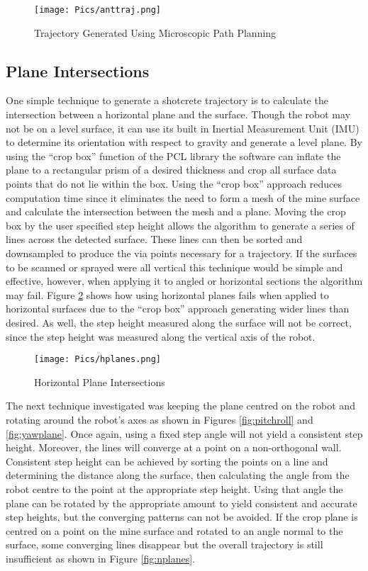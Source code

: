 \begin{figure}[h]
    \centering
    \texttt{[image: Pics/anttraj.png]}
    \caption{Trajectory Generated Using Microscopic Path Planning}
    \label{fig:anttraj}
\end{figure}

\subsection{Plane Intersections}

One simple technique to generate a shotcrete trajectory is to calculate the intersection between a horizontal plane and the surface. Though the robot may not be on a level surface, it can use its built in Inertial Measurement Unit (IMU) to determine its orientation with respect to gravity and generate a level plane. By using the ``crop box'' function of the PCL library the software can inflate the plane to a rectangular prism of a desired thickness and crop all surface data points that do not lie within the box. Using the ``crop box'' approach reduces computation time since it eliminates the need to form a mesh of the mine surface and calculate the intersection between the mesh and a plane. Moving the crop box by the user specified step height allows the algorithm to generate a series of lines across the detected surface. These lines can then be sorted and downsampled to produce the via points necessary for a trajectory. If the surfaces to be scanned or sprayed were all vertical this technique would be simple and effective, however, when applying it to angled or horizontal sections the algorithm may fail. Figure \ref{fig:hplanes} shows how using horizontal planes fails when applied to horizontal surfaces due to the ``crop box'' approach generating wider lines than desired. As well, the step height measured along the surface will not be correct, since the step height was measured along the vertical axis of the robot.\\

\begin{figure}[h]
    \centering
    \texttt{[image: Pics/hplanes.png]}
    \caption{Horizontal Plane Intersections}
    \label{fig:hplanes}
\end{figure}
The next technique investigated was keeping the plane centred on the robot and rotating around the robot's axes as shown in Figures \ref{fig:pitchroll} and \ref{fig:yawplane}. Once again, using a fixed step angle will not yield a consistent step height. Moreover, the lines will converge at a point on a non-orthogonal wall. Consistent step height can be achieved by sorting the points on a line and determining the distance along the surface, then calculating the angle from the robot centre to the point at the appropriate step height. Using that angle the plane can be rotated by the appropriate amount to yield consistent and accurate step heights, but the converging patterns can not be avoided. If the crop plane is centred on a point on the mine surface and rotated to an angle normal to the surface, some converging lines disappear but the overall trajectory is still insufficient as shown in Figure \ref{fig:nplanes}. \\

